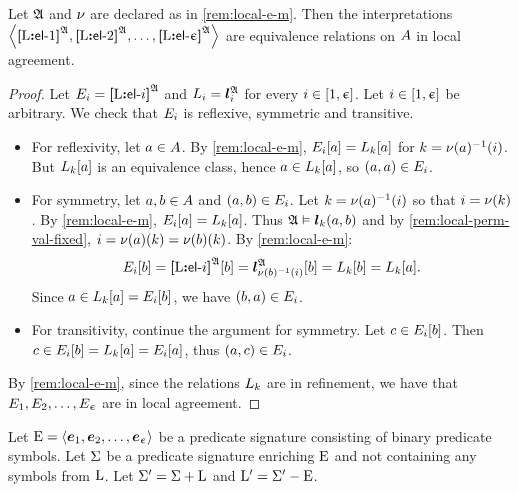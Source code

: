 \begin{remark}\label{rem:local-e-local}
Let $\mathfrak{A}$ and $\nu$ are declared as in \cref{rem:local-e-m}.
Then the interpretations
$\left\langle {\bm{[}\mathrm{L}\mathord{\bm{:}}\mathsf{el}{\hbox{-}}1\bm{]}}^{\mathfrak{A}},{\bm{[}\mathrm{L}\mathord{\bm{:}}\mathsf{el}{\hbox{-}}2\bm{]}}^{\mathfrak{A}},\dots,{\bm{[}\mathrm{L}\mathord{\bm{:}}\mathsf{el}{\hbox{-}}\upepsilon\bm{]}}^{\mathfrak{A}} \right\rangle$ are
equivalence relations on $A$ in local agreement.
\end{remark}
\begin{proof}
Let $E_{i} = {\bm{[}\mathrm{L}\mathord{\bm{:}}\mathsf{el}{\hbox{-}}i\bm{]}}^{\mathfrak{A}}$ and $L_{i} = \bm{l}_{i}^{\mathfrak{A}}$ for
every $i \in [1,\upepsilon]$.
Let $i \in [1,\upepsilon]$ be arbitrary.
We check that $E_{i}$ is reflexive, symmetric and transitive.
\begin{itemize}
  \item For reflexivity, let $a \in A$.
  By \cref{rem:local-e-m},
  $E_{i}[a] = L_{k}[a]$ for $k = \nu(a)^{-1}(i)$. 
  But $L_{k}[a]$ is an equivalence class, hence $a \in L_{k}[a]$,
  so $(a,a) \in E_{i}$.

  \item For symmetry, let $a, b \in A$ and $(a,b) \in E_{i}$.
  Let $k = \nu(a)^{-1}(i)$ so that $i = \nu(k)$.
  By \cref{rem:local-e-m}, $E_{i}[a] = L_{k}[a]$.
  Thus $\mathfrak{A} \vDash \bm{l}_{k}(a,b)$ and by
  \cref{rem:local-perm-val-fixed}, $i = \nu(a)(k) =
  \nu(b)(k)$.
  By \cref{rem:local-e-m}:
  \[
    E_{i}[b] =
    {\bm{[}\mathrm{L}\mathord{\bm{:}}\mathsf{el}{\hbox{-}}i\bm{]}}^{\mathfrak{A}}[b] =
    \bm{l}_{\nu(b)^{-1}(i)}^{\mathfrak{A}}[b] =
    L_{k}[b] = L_{k}[a].
  \]
  Since $a \in L_{k}[a] = E_{i}[b]$, we have $(b,a) \in
  E_{i}$.
   
  \item For transitivity, continue the argument for symmetry.
  Let $c \in E_{i}[b]$.
  Then $c \in E_{i}[b] = L_{k}[a] = E_{i}[a]$,
  thus $(a,c) \in E_{i}$.
\end{itemize}
By \cref{rem:local-e-m}, since the relations $L_{k}$ are in refinement, we
have that $E_{1}, E_{2}, \dots, E_{\upepsilon}$ are in local agreement.
\end{proof}

Let $\mathrm{E} = \left\langle \bm{e}_{1},\bm{e}_{2},\dots,\bm{e}_{\upepsilon} \right\rangle$ be a predicate signature consisting
of binary predicate symbols.
Let $\mathrm{\Sigma}$ be a predicate signature enriching $\mathrm{E}$
and not containing any symbols from $\mathrm{L}$. 
Let $\mathrm{\Sigma'} = \mathrm{\Sigma} + \mathrm{L}$ and ${\mathrm{L}'} = \mathrm{\Sigma'} - \mathrm{E}$.

